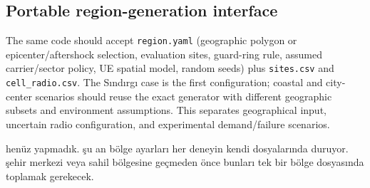 \documentclass[11pt,a4paper]{article}
\newenvironment{progress}{\par\smallskip\color{blue}}{\par\smallskip}
\begin{document}
\subsection{Portable region-generation interface}
The same code should accept \texttt{region.yaml} (geographic polygon or epicenter/aftershock selection, evaluation sites, guard-ring rule, assumed carrier/sector policy, UE spatial model, random seeds) plus \texttt{sites.csv} and \texttt{cell\_radio.csv}. The S\i nd\i rg\i{} case is the first configuration; coastal and city-center scenarios should reuse the exact generator with different geographic subsets and environment assumptions. This separates geographical input, uncertain radio configuration, and experimental demand/failure scenarios.

\begin{progress}
henüz yapmadık. şu an bölge ayarları her deneyin kendi dosyalarında duruyor. şehir merkezi veya sahil bölgesine geçmeden önce bunları tek bir bölge dosyasında toplamak gerekecek.
\end{progress}
\end{document}
